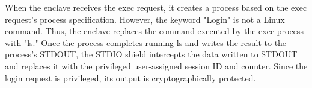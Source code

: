 When the enclave receives the exec request, it creates a process based on the exec request's process specification. However, the keyword "Login" is not a Linux command. Thus, the enclave replaces the command executed by the exec process with "ls." 
Once the process completes running ls and writes the result to the process's STDOUT, the STDIO shield intercepts the data written to STDOUT and replaces it with the privileged user-assigned session ID and counter. Since the login request is 
privileged, its output is cryptographically protected.



\cleardoublepage

